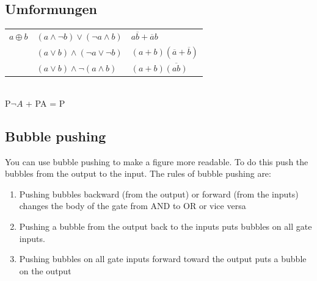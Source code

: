 \begin{multicols}{2}
	\subsection{Umformungen}
	\begin{center}
	\begin{tabular}{l@{\;=\;}l@{\quad=\;}l}
		$a \oplus b$ & $( a \land  \lnot b) \lor ( \lnot a \land b)$ & $a \overline{b} + \overline{a}b$ \\
		& $ (a \lor b) \land ( \lnot a \lor \lnot b) $ & $ (a+b)(\overline a + \overline b) $ \\
		& $ (a \lor b) \land \lnot(a \land b) $ & $ (a+b) \overline{(ab)} $ \\
	\end{tabular}\\
	P$\neg A$ + PA = P
	\end{center}
	
	\subsection{Bubble pushing}
	You can use bubble pushing to make a figure more readable. To do this push the bubbles from the output to the input.
	The rules of bubble pushing are:
	\begin{enumerate}
		\item Pushing bubbles backward (from the output) or forward (from the inputs) changes the body of the gate from AND to OR or vice versa
		\item Pushing a bubble from the output back to the inputs puts bubbles on all gate inputs.
		\item Pushing bubbles on all gate inputs forward toward the output puts a bubble on the output
	\end{enumerate}
	

\end{multicols}

